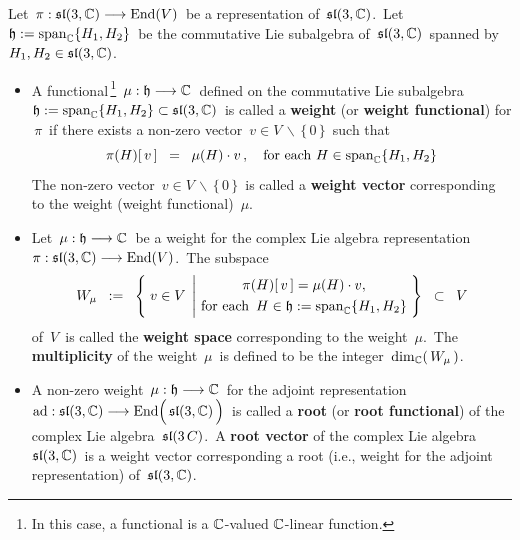 \begin{definition}
\mbox{}
\vskip 0.1cm
\noindent
Let \,$\pi : \sl(3,\C) \longrightarrow \End(V)$\,
be a representation of \,$\sl(3,\C)$.\,
Let \,$\mathfrak{h} := \span_{\C}\{H_{1},H_{2}\}$\,
be the commutative Lie subalgebra of \,$\sl(3,\C)$\, spanned by \,$H_{1}, H_{2} \in \sl(3,\C)$.\,
\begin{itemize}
\item
    A functional\,\footnote{In this case, a functional is a $\C$-valued $\C$-linear function.}
    \,$\mu : \mathfrak{h} \longrightarrow \C$\,
    defined on the commutative Lie subalgebra
    \,$\mathfrak{h} := \span_{\C}\{H_{1},H_{2}\} \subset \sl(3,\C)$\,
    is called a \textbf{weight} (or \textbf{weight functional}) for \,$\pi$\,
    if there exists a non-zero vector \,$v \in V\,\backslash\,\{\,0\,\}$\, such that
    \begin{equation*}
    \pi(H)\!\left[\,v\,\right]
    \;\; = \;\;
        \mu(H) \cdot v\,,
    \quad
    \textnormal{for each $H \in \span_{\C}\{H_{1},H_{2}\}$}
    \end{equation*}
    The non-zero vector \,$v \in V\,\backslash\,\{\,0\,\}$\,
    is called a \textbf{weight vector} corresponding to
    the weight (weight functional) \,$\mu$.\,
\item
    Let
    \,$\mu : \mathfrak{h} \longrightarrow \C$\,
    be a weight for the complex Lie algebra representation\
    \,$\pi : \sl(3,\C) \longrightarrow \End(V)$.\,
    The subspace
    \begin{equation*}
    W_{\mu}
    \;\; := \;\;
        \left\{\;
            v \in V
            \;\left\vert\!
            \begin{array}{c}
                \pi(H)\!\left[\,v\,\right] = \mu(H) \cdot v,
                \\
                \overset{{\color{white}.}}{
                    \textnormal{for each \,$H \in \mathfrak{h} := \span_{\C}\{H_{1},H_{2}\}$}
                    }
                \end{array}
            \right.
            \!\!\right\}
    \;\; \subset \;\;
        V
    \end{equation*}
    of \,$V$\, is called the \textbf{weight space} corresponding to the weight \,$\mu$.\,
    The \textbf{multiplicity} of the weight \,$\mu$\, is defined to be the integer
    \,$\dim_{\C}(\,W_{\mu}\,)$.\,
\item
    A {\color{red}non-zero} weight
    \,$\mu : \mathfrak{h} \longrightarrow \C$\,
    for the adjoint representation
    \,$\ad : \sl(3,\C) \longrightarrow \End\!\left(\,\overset{{\color{white}.}}{\sl(3,\C)}\,\right)$\,
    is called a \textbf{root} (or \textbf{root functional}) of the complex Lie algebra \,$\sl(3\,C)$.\,
    A \textbf{root vector} of the complex Lie algebra \,$\sl(3,\C)$\,
    is a weight vector corresponding a root (i.e., weight for the adjoint representation)
    of \,$\sl(3,\C)$.\, 
\end{itemize}
\end{definition}

